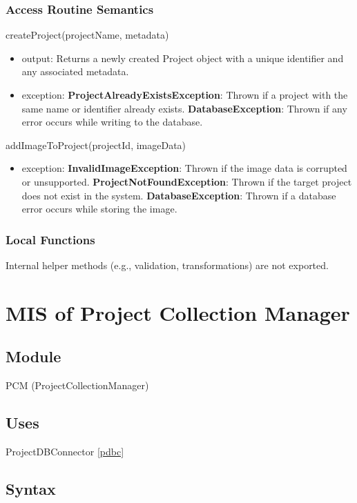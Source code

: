 \documentclass[12pt, titlepage]{article}
\begin{document}
    \subsubsection{Access Routine Semantics}
        \noindent createProject(projectName, metadata)
        \begin{itemize}
            \item output: Returns a newly created Project object with a unique identifier and any associated metadata.
            \item exception: \textbf{ProjectAlreadyExistsException}: Thrown if a project with the same name or identifier already exists. \textbf{DatabaseException}: Thrown if any error occurs while writing to the database.
        \end{itemize}
        \noindent addImageToProject(projectId, imageData)
        \begin{itemize}
            \item exception: \textbf{InvalidImageException}: Thrown if the image data is corrupted or unsupported. \textbf{ProjectNotFoundException}: Thrown if the target project does not exist in the system. \textbf{DatabaseException}: Thrown if a database error occurs while storing the image.
        \end{itemize}

    \subsubsection{Local Functions}
        Internal helper methods (e.g., validation, transformations) are not exported.

\section{MIS of Project Collection Manager} \label{pcm} 
    \subsection{Module}
        PCM (ProjectCollectionManager)

    \subsection{Uses}
        ProjectDBConnector \ref{pdbc}

    \subsection{Syntax}
\end{document}
